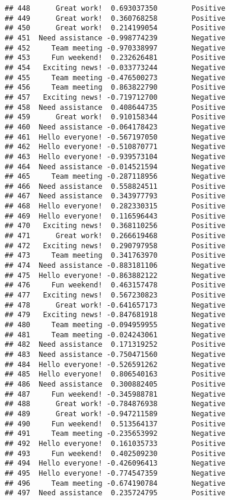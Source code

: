 \documentclass[
]{article}
\begin{document}
\begin{verbatim}
## 448      Great work!  0.693037350        Positive
## 449      Great work!  0.360768258        Positive
## 450      Great work!  0.214199054        Positive
## 451  Need assistance -0.998774239        Negative
## 452     Team meeting -0.970338997        Negative
## 453     Fun weekend!  0.232626481        Positive
## 454   Exciting news! -0.033773244        Negative
## 455     Team meeting -0.476500273        Negative
## 456     Team meeting  0.863822790        Positive
## 457   Exciting news! -0.719712700        Negative
## 458  Need assistance  0.408644735        Positive
## 459      Great work!  0.910158344        Positive
## 460  Need assistance -0.064178423        Negative
## 461  Hello everyone! -0.567197050        Negative
## 462  Hello everyone! -0.510870771        Negative
## 463  Hello everyone! -0.939573104        Negative
## 464  Need assistance -0.014521594        Negative
## 465     Team meeting -0.287118956        Negative
## 466  Need assistance  0.558824511        Positive
## 467  Need assistance  0.343977793        Positive
## 468  Hello everyone!  0.282330315        Positive
## 469  Hello everyone!  0.116596443        Positive
## 470   Exciting news!  0.368110256        Positive
## 471      Great work!  0.266619468        Positive
## 472   Exciting news!  0.290797958        Positive
## 473     Team meeting  0.341763970        Positive
## 474  Need assistance -0.883181106        Negative
## 475  Hello everyone! -0.863882122        Negative
## 476     Fun weekend!  0.463157478        Positive
## 477   Exciting news!  0.567230823        Positive
## 478      Great work! -0.641657173        Negative
## 479   Exciting news! -0.847681918        Negative
## 480     Team meeting -0.094959955        Negative
## 481     Team meeting -0.024243061        Negative
## 482  Need assistance  0.171319252        Positive
## 483  Need assistance -0.750471560        Negative
## 484  Hello everyone! -0.526591262        Negative
## 485  Hello everyone!  0.806540163        Positive
## 486  Need assistance  0.300882405        Positive
## 487     Fun weekend! -0.345988781        Negative
## 488      Great work! -0.784876938        Negative
## 489      Great work! -0.947211589        Negative
## 490     Fun weekend!  0.513564137        Positive
## 491     Team meeting -0.235653992        Negative
## 492  Hello everyone!  0.161035733        Positive
## 493     Fun weekend!  0.402509230        Positive
## 494  Hello everyone! -0.426096413        Negative
## 495  Hello everyone! -0.774547359        Negative
## 496     Team meeting -0.674190784        Negative
## 497  Need assistance  0.235724795        Positive

\end{verbatim}
\end{document}
